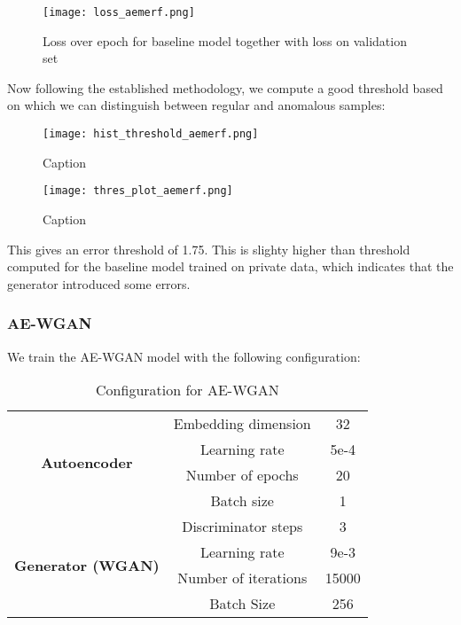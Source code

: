 \begin{figure}[h]
    \centering
    \texttt{[image: loss\_aemerf.png]}
    \caption{Loss over epoch for baseline model together with loss on validation set}
    \label{fig:loss_aemerf}
\end{figure}

Now following the established methodology, we compute a good threshold based on which we can distinguish between regular and anomalous samples:

\begin{figure}[h]
    \begin{minipage}[b]{0.45\textwidth}
        \centering
        \texttt{[image: hist\_threshold\_aemerf.png]}
        \caption{Caption}
        \label{fig:enter-label}
    \end{minipage}
    \begin{minipage}[b]{0.45\textwidth}
        \centering
        \texttt{[image: thres\_plot\_aemerf.png]}
        \caption{Caption}
        \label{fig:enter-label}
    \end{minipage}
\end{figure}

This gives an error threshold of 1.75. This is slighty higher than threshold computed for the baseline model trained on private data, which indicates that the generator introduced some errors.

\subsubsection*{AE-WGAN}
We train the AE-WGAN model with the following configuration:

\begin{table}[h]
    \centering
    \begin{tabular}{|c|c|c|}
        \hline
        \multirow{4}{*}{\textbf{Autoencoder}}& Embedding dimension & 32 \\ 
                                    & Learning rate & 5e-4 \\
                                    & Number of epochs& 20\\
                                    & Batch size & 1\\
        \hline
        \multirow{4}{*}{\textbf{Generator (WGAN)}} & Discriminator steps & 3 \\
                                        & Learning rate & 9e-3\\
                                        & Number of iterations & 15000\\
                                        & Batch Size & 256 \\
        \hline
    \end{tabular}
    \caption{Configuration for AE-WGAN}
\end{table}


